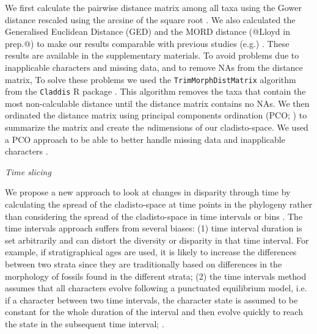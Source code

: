 \documentclass[12pt,letterpaper]{article}
\renewcommand{\subsection}[1]{%
\bigskip
\begin{center}
\begin{large}
\normalfont\itshape #1
\end{large}
\end{center}}
\begin{document}
We first calculate the pairwise distance matrix among all taxa using the Gower distance \citep{Gower71} rescaled using the arcsine of the square root \citep{Claddis}. 
We also calculated the Generalised Euclidean Distance (GED) \cite{Wills2001} and the MORD distance (@Lloyd in prep.@) to make our results comparable with previous studies (e.g.) 
. These results are available in the supplementary materials. %
To avoid problems due to inapplicable characters and missing data, and to remove NAs from the distance matrix,
To solve these problems we used the \texttt{TrimMorphDistMatrix} algorithm
from the \texttt{Claddis} R package \citep{Claddis}. This algorithm 
removes the taxa that contain the most non-calculable distance until the distance matrix contains no NAs. 
We then ordinated the distance matrix using principal components ordination
(PCO; \citealt{GOWER01121966}) to summarize the matrix and create the \textit{n}dimensions of our cladisto-space. We used a PCO approach to be able to better handle missing data and inapplicable characters \cite{lofgren2003,Wesley-Hunt2005}.

\subsection{Time slicing} %
We propose a new approach to look at changes in disparity
through time by calculating the spread of the cladisto-space at time points in the phylogeny rather than considering the spread of the cladisto-space in time intervals or bins \citep[e.g.][]{Brusatte12092008,brusattedinosaur2012,toljagictriassic-jurassic2013}. The time intervals approach suffers from several biases: (1) time interval duration is set arbitrarily and can distort the diversity or disparity in that time interval. For example, if stratigraphical ages are used, it is likely to increase the differences between two strata since they are traditionally based on differences in the morphology of fossils found in the different strata; (2) the time intervals method assumes that all characters evolve following a punctuated equilibrium model, i.e. if a character 
between two time intervals, the character state is assumed to be constant for the whole duration of the interval and then evolve quickly to reach the state in the subsequent time interval; \citealt{Gould1977}. %
\end{document}
